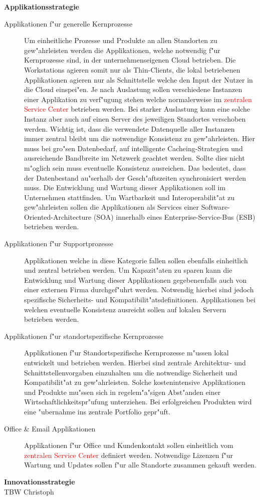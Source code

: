 \textbf{Applikationsstrategie}\\

\begin{description}
	
	\item[Applikationen f"ur generelle Kernprozesse] Um einheitliche Prozesse und Produkte an allen Standorten zu gew"ahrleisten werden die Applikationen, welche notwendig f"ur Kernprozesse sind, in der unternehmenseigenen Cloud betrieben. Die Workstations agieren somit nur als Thin-Clients, die lokal betriebenen Applikationen agieren nur als Schnittstelle welche den Input der Nutzer in die Cloud einspei"en. Je nach Auslastung sollen verschiedene Instanzen einer Applikation zu verf"ugung stehen welche normalerweise im \textcolor{red}{zentralen Service Center} betrieben werden. Bei starker Auslastung kann eine solche Instanz aber auch auf einen Server des jeweiligen Standortes verschoben werden. Wichtig ist, dass die verwendete Datenquelle aller Instanzen immer zentral bleibt um die notwendige Konsistenz zu gew"ahrleisten. Hier muss bei gro"sen Datenbedarf, auf intelligente Cacheing-Strategien und ausreichende Bandbreite im Netzwerk geachtet werden. Sollte dies nicht m"oglich sein muss eventuelle Konsistenz ausreichen. Das bedeutet, dass der Datenbestand au"serhalb der Gesch"aftszeiten synchronisiert werden muss. Die Entwicklung und Wartung dieser Applikationen soll im Unternehmen stattfinden. Um Wartbarkeit und Interoperabilit"at zu gew"ahrleisten sollen die Applikationen als Services einer Software-Oriented-Architecture (SOA) innerhalb eines Enterprise-Service-Bus (ESB) betrieben werden.  
	
	\item[Applikationen f"ur Supportprozesse] Applikationen welche in diese Kategorie fallen sollen ebenfalls einheitlich und zentral betrieben werden. Um Kapazit"aten zu sparen kann die Entwicklung und Wartung dieser Applikationen gegebenenfalls auch von einer externen Firma durchgef"uhrt werden. Notwendig hierbei sind jedoch spezifische Sicherheits- und Kompatibilit"atsdefinitionen. Applikationen bei welchen eventuelle Konsistenz ausreicht sollen auf lokalen Servern betrieben werden. 
	
	\item[Applikationen f"ur standortspezifische Kernprozesse] Applikationen f"ur Standortspezifische Kernprozesse m"ussen lokal entwickelt und betrieben werden. Hierbei sind zentrale Architektur- und Schnittstellenvorgaben einzuhalten um die notwendige Sicherheit und Kompatibilit"at zu gew"ahrleisten. Solche kostenintensive Applikationen und Produkte mu"ssen sich in regelem"a"sigen Abst"anden einer Wirtschaftlichkeitspr"ufung unterziehen. Bei erfolgreichen Produkten wird eine "ubernahme ins zentrale Portfolio gepr"uft. 

	\item[Office \& Email Applikationen] Applikationen f"ur Office und Kundenkontakt sollen einheitlich vom \textcolor{red}{zentralen Service Center} definiert werden. Notwendige Lizenzen f"ur Wartung und Updates sollen f"ur alle Standorte zusammen gekauft werden.

\end{description}

\textbf{Innovationsstrategie}\\
TBW Christoph\\\\